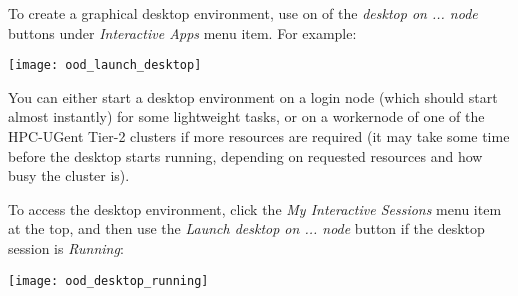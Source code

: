 To create a graphical desktop environment, use on of the \emph{desktop on ... node} buttons under \emph{Interactive Apps} menu item. For example:

\begin{center}
    \texttt{[image: ood\_launch\_desktop]}
\end{center}

You can either start a desktop environment on a login node (which should start almost instantly)
for some lightweight tasks, or on a workernode of one of the HPC-UGent Tier-2 clusters if
more resources are required (it may take some time before the desktop starts running, depending
on requested resources and how busy the cluster is).


To access the desktop environment, click the \emph{My Interactive Sessions} menu item at the top,
and then use the \emph{Launch desktop on ... node} button if the desktop session is \emph{Running}:

\begin{center}
    \texttt{[image: ood\_desktop\_running]}
\end{center}

